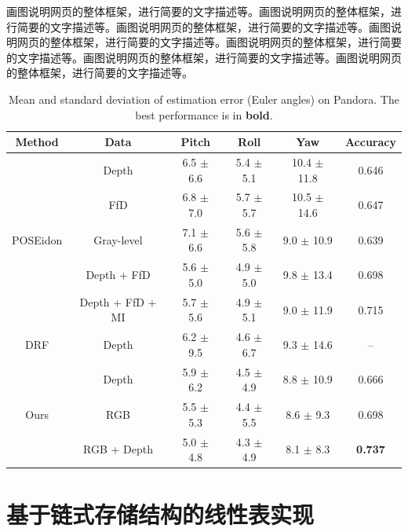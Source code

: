 \documentclass[supercite]{Experimental_Report}
\theoremstyle{definition}
\begin{document}
画图说明网页的整体框架，进行简要的文字描述等。画图说明网页的整体框架，进行简要的文字描述等。画图说明网页的整体框架，进行简要的文字描述等。画图说明网页的整体框架，进行简要的文字描述等。画图说明网页的整体框架，进行简要的文字描述等。画图说明网页的整体框架，进行简要的文字描述等。画图说明网页的整体框架，进行简要的文字描述等。

\begin{table}
	\begin{center}
		\setlength{\tabcolsep}{2.0mm}
		\caption{Mean and standard deviation of estimation error (Euler angles) on Pandora. The best performance is in \textbf{bold}.}
		\label{table2}
		\begin{tabular}{c|ccccc}
			\hline
			Method    			        & Data               & Pitch         & Roll           & Yaw              & Accuracy\\
			\hline
			\hline			
			\multirow{5}{*}{POSEidon}   & Depth              & 6.5 $\pm$ 6.6  & 5.4 $\pm$ 5.1  & 10.4 $\pm$ 11.8  & 0.646\\
			& FfD              	 & 6.8 $\pm$ 7.0  & 5.7 $\pm$ 5.7  & 10.5 $\pm$ 14.6  & 0.647\\
			& Gray-level         & 7.1 $\pm$ 6.6  & 5.6 $\pm$ 5.8  & 9.0  $\pm$ 10.9  & 0.639\\
			& Depth + FfD	     & 5.6 $\pm$ 5.0  & 4.9 $\pm$ 5.0  & 9.8  $\pm$ 13.4  & 0.698\\
			& Depth + FfD + MI   & 5.7 $\pm$ 5.6  & 4.9 $\pm$ 5.1  & 9.0  $\pm$ 11.9  & 0.715\\
			\hline
			DRF                         & Depth              & 6.2 $\pm$ 9.5  & 4.6 $\pm$ 6.7  & 9.3  $\pm$ 14.6  & --\\
			\hline
			\multirow{3}{*}{Ours}   	& Depth              & 5.9 $\pm$ 6.2  & 4.5 $\pm$ 4.9  & 8.8  $\pm$ 10.9  & 0.666\\
			& RGB                & 5.5 $\pm$ 5.3  & 4.4 $\pm$ 5.5  & 8.6  $\pm$ 9.3   & 0.698\\
			& RGB + Depth        & 5.0 $\pm$ 4.8  & 4.3 $\pm$ 4.9  & 8.1  $\pm$ 8.3   & \textbf{0.737}\\
			\hline
		\end{tabular}
	\end{center}
\end{table}

\newpage

\section{基于链式存储结构的线性表实现}
\end{document}
